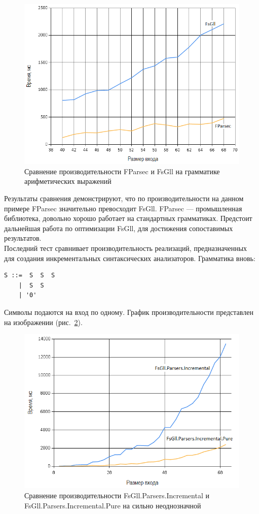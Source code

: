 \documentclass[14pt]{matmex-diploma}
\begin{document}
\begin{figure}[!h]
  \label{ec_fparsec_fsgll_1}
  \centering
  \includegraphics[width=15cm]{pics/graph2.png}
  \caption{Сравнение производительности FParsec и FsGll на грамматике арифметических выражений}
\end{figure}
\FloatBarrier

Результаты сравнения демонстрируют, что по производительности на данном примере FParsec значительно превосходит FsGll. FParsec --- промышленная библиотека, довольно хорошо работает на стандартных грамматиках. Предстоит дальнейшая работа по оптимизации FsGll, для достижения сопоставимых результатов.
\\
Последний тест сравнивает производительность реализаций, предназначенных для создания 
инкрементальных синтаксических анализаторов. Грамматика вновь:
\begin{lstlisting}
S ::=  S  S  S 
    |  S  S 
    | '0'
\end{lstlisting}
Символы подаются на вход по одному. 
График производительности представлен на изображении (рис.~\ref{nnn_fsgll_incr}). \\

	
\begin{figure}[!h]
  \label{nnn_fsgll_incr}
  \centering
  \includegraphics[width=15cm]{pics/graph3.png}
  \caption{Сравнение производительности FsGll.Parsers.Incremental и FsGll.Parsers.Incremental.Pure на сильно неоднозначной}
\end{figure}
\FloatBarrier
\end{document}
